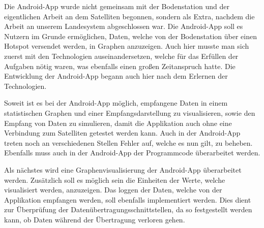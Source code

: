 Die Android-App wurde nicht gemeinsam mit der Bodenstation und der eigentlichen Arbeit an dem Satelliten begonnen, sondern als Extra, nachdem die Arbeit an unserem Landesystem abgeschlossen war. Die Android-App soll es Nutzern im Grunde ermöglichen, Daten, welche von der Bodenstation über einen Hotspot versendet werden, in Graphen anzuzeigen. Auch hier musste man sich zuerst mit den Technologien auseinandersetzen, welche für das Erfüllen der Aufgaben nötig waren, was ebenfalls einen großen Zeitanspruch hatte. Die Entwicklung der Android-App begann auch hier nach dem Erlernen der Technologien.

Soweit ist es bei der Android-App möglich, empfangene Daten in einem statistischen Graphen und einer Empfangsdarstellung zu visualisieren, sowie den Empfang von Daten zu simulieren, damit die Applikation auch ohne eine Verbindung zum Satelliten getestet werden kann. Auch in der Android-App treten noch an verschiedenen Stellen Fehler auf, welche es nun gilt, zu beheben. Ebenfalls muss auch in der Android-App der Programmcode überarbeitet werden.

Als nächstes wird eine Graphenvisualisierung der Android-App überarbeitet werden. Zusätzlich soll es möglich sein die Einheiten der Werte, welche visualisiert werden, anzuzeigen. Das loggen der Daten, welche von der Applikation empfangen werden, soll ebenfalls implementiert werden. Dies dient zur Überprüfung der Datenübertragungsschnittstellen, da so festgestellt werden kann, ob Daten während der Übertragung verloren gehen.